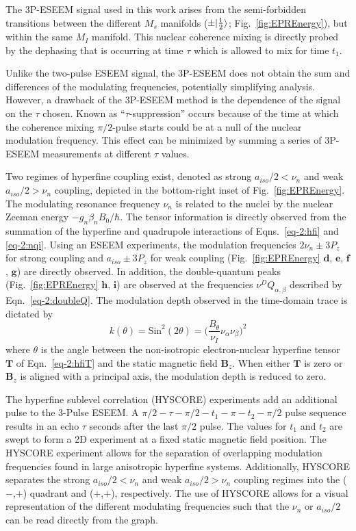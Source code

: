 The 3P-ESEEM signal used in this work arises from the semi-forbidden transitions between the different $M_s$ manifolds ($\pm \lvert\frac{1}{2}\rangle$; Fig.~\ref{fig:EPREnergy}), but within the same $M_I$ manifold. This nuclear coherence mixing is directly probed by the dephasing that is occurring at time $\tau$ which is allowed to mix for time $t_1$. 

Unlike the two-pulse ESEEM signal, the 3P-ESEEM does not obtain the sum and differences of the modulating frequencies, potentially simplifying analysis. However, a drawback of the 3P-ESEEM method is the dependence of the signal on the $\tau$ chosen. Known as ``$\tau$-suppression'' occurs because of the time at which the coherence mixing $\pi/2$-pulse starts could be at a null of the nuclear modulation frequency. \cite{schweiger2001principles} This effect can be minimized by summing a series of 3P-ESEEM measurements at different $\tau$ values.

Two regimes of hyperfine coupling exist, denoted as strong $a_{iso}/2 < \nu_n$ and weak $a_{iso}/2 > \nu_n$ coupling, depicted in the bottom-right inset of Fig.~\ref{fig:EPREnergy}. The modulating resonance frequency $\nu_n$ is related to the nuclei by the nuclear Zeeman energy $-g_n \beta_n B_0/\hbar$. The tensor information is directly observed from the summation of the hyperfine and quadrupole interactions of Eqns.~\ref{eq-2:hfi} and \ref{eq-2:nqi}. Using an ESEEM experiments, the modulation frequencies $2\nu_n \pm 3P_z$ for strong coupling and $a_{iso} \pm 3P_z$ for weak coupling (Fig.~\ref{fig:EPREnergy} $\mathbf{d}$, $\mathbf{e}$, $\mathbf{f}$, $\mathbf{g}$) are directly observed. In addition, the double-quantum peaks (Fig.~\ref{fig:EPREnergy} $\mathbf{h}$, $\mathbf{i}$) are observed at the frequencies $\nu^DQ_{\alpha,\beta}$ described by Eqn.~\ref{eq-2:doubleQ}. The modulation depth observed in the time-domain trace is dictated by
\begin{equation}
    k(\theta) = \text{Sin}^2(2\theta) = \bigg(\frac{B_\theta}{\nu_I}{\nu_\alpha \nu_\beta}\bigg)^2
\end{equation}
where $\theta$ is the angle between the non-isotropic electron-nuclear hyperfine tensor $\mathbf{T}$ of Eqn.~\ref{eq-2:hfiT} and the static magnetic field $\mathbf{B}_z$. When either $\mathbf{T}$ is zero or $\mathbf{B}_z$ is aligned with a principal axis, the modulation depth is reduced to zero.

The hyperfine sublevel correlation (HYSCORE) experiments add an additional pulse to the 3-Pulse ESEEM. A  ${\pi/2\!-\!\tau\!-\!\pi/2\!-\!t_1\!-\!\pi\!-\!t_2\!-\!\pi/2}$ pulse sequence results in an echo $\tau$ seconds after the last $\pi/2$ pulse. The values for $t_1$ and $t_2$ are swept to form a 2D experiment at a fixed static magnetic field position. The HYSCORE experiment allows for the separation of overlapping modulation frequencies found in large anisotropic hyperfine systems. Additionally, HYSCORE separates the strong $a_{iso}/2 < \nu_n$ and weak $a_{iso}/2 > \nu_n$ coupling regimes into the ($-$,$+$) quadrant and ($+$,$+$), respectively. The use of HYSCORE allows for a visual representation of the different modulating frequencies such that the $\nu_n$ or $a_{iso}/2$ can be read directly from the graph. 

